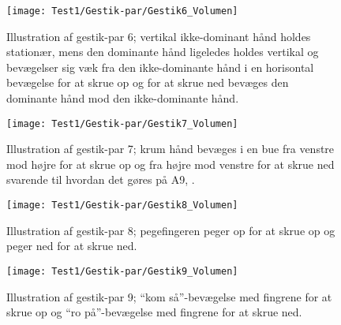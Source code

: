 \noindent
%
%
\begin{figure}[H]
	\centering
	\texttt{[image: Test1/Gestik-par/Gestik6\_Volumen]}
	\caption{Illustration af gestik-par 6; vertikal ikke-dominant hånd holdes stationær, mens den dominante hånd ligeledes holdes vertikal og bevægelser sig væk fra den ikke-dominante hånd i en horisontal bevægelse for at skrue op og for at skrue ned bevæges den dominante hånd mod den ikke-dominante hånd.}
	\label{fig:GestikPar6VolumenApp}
\end{figure}
\noindent
%
%
\begin{figure}[H]
	\centering
	\texttt{[image: Test1/Gestik-par/Gestik7\_Volumen]}
	\caption{Illustration af gestik-par 7; krum hånd bevæges i en bue fra venstre mod højre for at skrue op og fra højre mod venstre for at skrue ned svarende til hvordan det gøres på A9, \parencite{WEB:BeoplayA9}.}
	\label{fig:GestikPar7VolumenApp}
\end{figure}
\noindent
%
%
\begin{figure}[H]
	\centering
	\texttt{[image: Test1/Gestik-par/Gestik8\_Volumen]}
	\caption{Illustration af gestik-par 8; pegefingeren peger op for at skrue op og peger ned for at skrue ned.}
	\label{fig:GestikPar8VolumenApp}
\end{figure}
\noindent
%
%
\begin{figure}[H]
	\centering
	\texttt{[image: Test1/Gestik-par/Gestik9\_Volumen]}
	\caption{Illustration af gestik-par 9; \enquote{kom så}-bevægelse med fingrene for at skrue op og \enquote{ro på}-bevægelse med fingrene for at skrue ned.}
	\label{fig:GestikPar9VolumenApp}
\end{figure}
\noindent
%